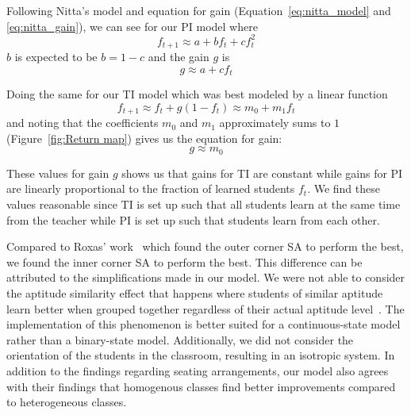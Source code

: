 \documentclass[twocolumn,secnumarabic,amssymb, nobibnotes, aps, prd]{revtex4-2}
\begin{document}
        Following Nitta's model and equation for gain (Equation~\ref{eq:nitta_model} and \ref{eq:nitta_gain}), we can see for our PI model where
%
        \begin{equation}
            \label{eq:PI_ft_eq}
            f_{t+1} \approx a + bf_t + cf_t^2
        \end{equation}
%
        $b$ is expected to be $b=1-c$ and the gain $g$ is
%
        \begin{equation}
            \label{eq:PI_g_eq}
            g \approx a + cf_t
        \end{equation}

        Doing the same for our TI model which was best modeled by a linear function
%
        \begin{equation}
            \label{eq:TI_ft_eq}
            f_{t+1} \approx f_t + g(1-f_t) \approx m_0 + m_1f_t
        \end{equation}
%
        and noting that the coefficients $m_0$ and $m_1$ approximately sums to $1$ (Figure~\ref{fig:Return map}) gives us the equation for gain:
%
       \begin{equation}
            \label{eq:TI_g_eq}
            g \approx m_0
       \end{equation}

       These values for gain $g$ shows us that gains for TI are constant while gains for PI are linearly proportional to the fraction of learned students $f_t$.
       We find these values reasonable since TI is set up such that all students learn at the same time from the teacher while PI is set up such that students learn from each other.

        Compared to Roxas' work~\cite{roxas2010seating} which found the outer corner SA to perform the best, we found the inner corner SA to perform the best.
        This difference can be attributed to the simplifications made in our model.
        We were not able to consider the aptitude similarity effect that happens where students of similar aptitude learn better when grouped together regardless of their actual aptitude level~\cite{smith2009peer}.
        The implementation of this phenomenon is better suited for a continuous-state model rather than a binary-state model.
        Additionally, we did not consider the orientation of the students in the classroom, resulting in an isotropic system.
        In addition to the findings regarding seating arrangements, our model also agrees with their findings that homogenous classes find better improvements compared to heterogeneous classes.
    
\end{document}
